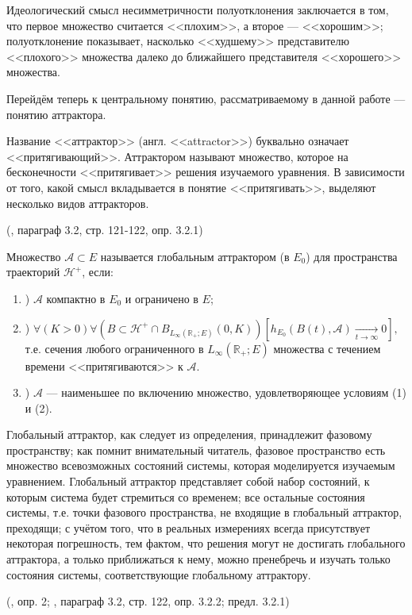 Идеологический смысл несимметричности полуотклонения заключается в том,
что первое множество считается <<плохим>>, а второе --- <<хорошим>>;
полуотклонение показывает, насколько <<худшему>> представителю <<плохого>> множества далеко до ближайшего представителя <<хорошего>> множества.

Перейдём теперь к центральному понятию, рассматриваемому в данной работе --- понятию аттрактора.

Название <<аттрактор>> (англ. <<attractor>>) буквально означает <<притягивающий>>.
Аттрактором называют множество, которое на бесконечности <<притягивает>> решения изучаемого уравнения.
В зависимости от того, какой смысл вкладывается в понятие <<притягивать>>,
выделяют несколько видов аттракторов.

\opred (\cite{Zelenaya}, параграф 3.2, стр. 121-122, опр. 3.2.1)

Множество  $\mathcal{A} \subset E $ называется глобальным аттрактором (в $E_0$) для пространства траекторий $\mathcal{H}^+$, если:
\begin{enumerate}
	\item)
		$\mathcal{A}$ компактно в $E_0$ и ограничено в $E$;
	\item)
		$
			\forall(K>0)\forall(B \subset \mathcal{H}^+ \cap B_{L_{\infty}\left( \mathbb{R}_+; E \right)}(0,K))
				\left[
					h_{E_0}(B(t),\mathcal{A}) \xrightarrow[t\to \infty]{}{0}
				\right],
		$
		т.е. сечения любого ограниченного в $L_{\infty}\left( \mathbb{R}_+; E \right)$ множества с течением времени <<притягиваются>> к $\mathcal{A}$.
	\item)
		$\mathcal{A}$ --- наименьшее по включению множество, удовлетворяющее условиям (1) и (2).
\end{enumerate}


Глобальный аттрактор, как следует из определения, принадлежит фазовому пространству;
как помнит внимательный читатель, фазовое пространство есть множество всевозможных состояний системы, которая моделируется изучаемым уравнением.
Глобальный аттрактор представляет собой набор состояний, к которым система будет стремиться со временем;
все остальные состояния системы, т.е. точки фазового пространства, не входящие в глобальный аттрактор, преходящи;
с учётом того, что в реальных измерениях всегда присутствует некоторая погрешность, тем фактом, что решения могут не достигать глобального аттрактора, а только приближаться к нему, можно пренебречь и изучать только состояния системы, соответствующие глобальному аттрактору.

\opred (\cite{zhidkosti_s_pamyatyu}, опр. 2; \cite{Zelenaya}, параграф 3.2, стр. 122, опр. 3.2.2; предл. 3.2.1)

